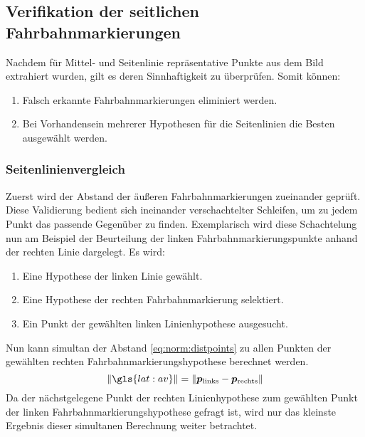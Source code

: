 \subsection{Verifikation der seitlichen Fahrbahnmarkierungen \dcsecondauthorshort}
Nachdem für Mittel- und Seitenlinie repräsentative Punkte aus dem Bild extrahiert wurden, gilt es deren Sinnhaftigkeit zu überprüfen. Somit können:
\begin{enumerate}
\item Falsch erkannte Fahrbahnmarkierungen eliminiert werden.
\item Bei Vorhandensein mehrerer Hypothesen für die Seitenlinien die Besten ausgewählt werden.
\end{enumerate}

\subsubsection{Seitenlinienvergleich} 
\label{sssec:fahrspurerkennung:riverflow:verifikation:seitenlinienvergleich}
Zuerst wird der Abstand der äußeren Fahrbahnmarkierungen zueinander geprüft. Diese Validierung bedient sich ineinander verschachtelter Schleifen, um zu jedem Punkt das passende Gegenüber zu finden. Exemplarisch wird diese Schachtelung nun am Beispiel der Beurteilung der linken Fahrbahnmarkierungspunkte anhand der rechten Linie dargelegt. Es wird:
\begin{enumerate}
\item 
Eine Hypothese der linken Linie gewählt.
\item \label{item:riverflow:verification:l_r:loops:right_hypo}
Eine Hypothese der rechten Fahrbahnmarkierung selektiert.
\item \label{item:riverflow:verification:l_r:loops:point}
Ein Punkt der gewählten linken Linienhypothese ausgesucht.
\end{enumerate}
Nun kann simultan der Abstand  \eqref{eq:norm:distpoints} 
zu allen Punkten der gewählten rechten Fahrbahnmarkierungshypothese berechnet werden. 
\begin{equation}
\label{eq:norm:distpoints} 
\nrm{\gls{lat:av}} = \nrm{\pnt{p_{\text{links}}} - \pnt{p_{\text{rechts}}}} 
\end{equation}
Da der nächstgelegene Punkt der rechten Linienhypothese zum gewählten Punkt der linken Fahrbahnmarkierungshypothese gefragt ist, wird nur das kleinste Ergebnis dieser simultanen Berechnung weiter betrachtet.

